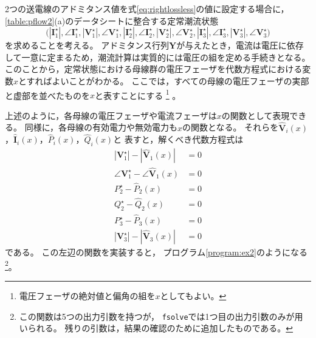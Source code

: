 \documentclass[tombow,dvipdfmx]{corona-a5-1.1}
\begin{document}
{\begin{例}[潮流計算の実装法]
2つの送電線のアドミタンス値を式\ref{eq:rightlossless}の値に設定する場合に，\ref{table:pflow2}(a)のデータシートに整合する定常潮流状態
\[
\bigl(
|\bm{I}_1^{\star}|,\angle \bm{I}_1^{\star},
|\bm{V}_1^{\star}|,\angle \bm{V}_1^{\star},
|\bm{I}_2^{\star}|,\angle \bm{I}_2^{\star},
|\bm{V}_2^{\star}|,\angle \bm{V}_2^{\star},
|\bm{I}_3^{\star}|,\angle \bm{I}_3^{\star},
|\bm{V}_3^{\star}|,\angle \bm{V}_3^{\star}
\bigr)
\]
を求めることを考える。
アドミタンス行列$\bm Y$が与えたとき，電流は電圧に依存して一意に定まるため，潮流計算は実質的には電圧の組を定める手続きとなる。
このことから，定常状態における母線群の電圧フェーザを代数方程式における変数$x$とすればよいことがわかる。
ここでは，すべての母線の電圧フェーザの実部と虚部を並べたものを$x$と表すことにする
\footnote{電圧フェーザの絶対値と偏角の組を$x$としてもよい。}
。


上述のように，各母線の電圧フェーザや電流フェーザは$x$の関数として表現できる。
同様に，各母線の有効電力や無効電力も$x$の関数となる。
それらを$\hat{\bm V}_i(x)$，$\hat{\bm I}_i(x)$，$\hat{P}_i(x)$，$\hat{Q}_i(x)$と
表すと，解くべき代数方程式は
\begin{align*}
    |\bm V_1^{\star}|-|\hat{\bm V}_1(x)| &= 0\\
    \angle \bm V_1^{\star} - \angle \hat{\bm V}_1(x) &= 0\\
    P_2^{\star} -\hat P_2(x) &= 0\\
    Q_2^{\star} -\hat Q_2(x) &= 0\\
    P_3^{\star} -\hat P_3(x) &= 0\\
    |\bm V_3^{\star}|-|\hat{\bm V}_3(x)| &= 0
 \end{align*}
 である。
 この左辺の関数を実装すると，
 プログラム\nobreak\ref{program:ex2}のようになる \footnote{この関数は5つの出力引数を持つが，
 \texttt{fsolve}では1つ目の出力引数のみが用いられる。
 残りの引数は，結果の確認のために追加したものである。}。



\end{例}}
\end{document}
